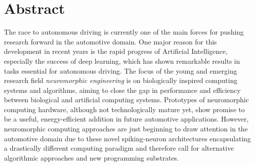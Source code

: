 \chapter*{Abstract}

The race to autonomous driving is currently one of the main forces for pushing research forward in the automotive domain.
One major reason for this development in recent years is the rapid progress of Artificial Intelligence, especially the success of deep learning, which has shown remarkable results in tasks essential for autonomous driving.
The focus of the young and emerging research field \emph{neuromorphic engineering} is on biologically inspired computing systems and algorithms, aiming to close the gap in performance and efficiency between biological and artificial computing systems.
Prototypes of neuromorphic computing hardware, although not technologically mature yet, show promise to be a useful, energy-efficient addition in future automotive applications.
However, neuromorphic computing approaches are just beginning to draw attention in the automotive domain due to these novel spiking-neuron architectures encapsulating a drastically different computing paradigm and therefore call for alternative algorithmic approaches and new programming substrates.

